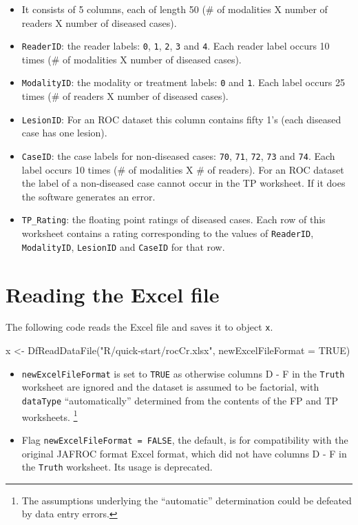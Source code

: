 \documentclass[
]{book}
\newenvironment{Shaded}{\begin{snugshade}}{\end{snugshade}}
\newcommand{\AttributeTok}[1]{\textcolor[rgb]{0.77,0.63,0.00}{#1}}
\newcommand{\ConstantTok}[1]{\textcolor[rgb]{0.00,0.00,0.00}{#1}}
\newcommand{\FunctionTok}[1]{\textcolor[rgb]{0.00,0.00,0.00}{#1}}
\newcommand{\NormalTok}[1]{#1}
\newcommand{\OtherTok}[1]{\textcolor[rgb]{0.56,0.35,0.01}{#1}}
\newcommand{\StringTok}[1]{\textcolor[rgb]{0.31,0.60,0.02}{#1}}
\providecommand{\tightlist}{%
  \setlength{\itemsep}{0pt}\setlength{\parskip}{0pt}}
\begin{document}
\begin{itemize}
\tightlist
\item
  It consists of 5 columns, each of length 50 (\# of modalities X number of readers X number of diseased cases).
\item
  \texttt{ReaderID}: the reader labels: \texttt{0}, \texttt{1}, \texttt{2}, \texttt{3} and \texttt{4}. Each reader label occurs 10 times (\# of modalities X number of diseased cases).
\item
  \texttt{ModalityID}: the modality or treatment labels: \texttt{0} and \texttt{1}. Each label occurs 25 times (\# of readers X number of diseased cases).
\item
  \texttt{LesionID}: For an ROC dataset this column contains fifty 1's (each diseased case has one lesion).
\item
  \texttt{CaseID}: the case labels for non-diseased cases: \texttt{70}, \texttt{71}, \texttt{72}, \texttt{73} and \texttt{74}. Each label occurs 10 times (\# of modalities X \# of readers). For an ROC dataset the label of a non-diseased case cannot occur in the TP worksheet. If it does the software generates an error.
\item
  \texttt{TP\_Rating}: the floating point ratings of diseased cases. Each row of this worksheet contains a rating corresponding to the values of \texttt{ReaderID}, \texttt{ModalityID}, \texttt{LesionID} and \texttt{CaseID} for that row.
\end{itemize}

\hypertarget{quick-start-read-datafile-structure-roc-dataset}{%
\section{Reading the Excel file}\label{quick-start-read-datafile-structure-roc-dataset}}

The following code reads the Excel file and saves it to object \texttt{x}.

\begin{Shaded}
\begin{Highlighting}[]
\NormalTok{x }\OtherTok{\textless{}{-}} \FunctionTok{DfReadDataFile}\NormalTok{(}\StringTok{"R/quick{-}start/rocCr.xlsx"}\NormalTok{, }\AttributeTok{newExcelFileFormat =} \ConstantTok{TRUE}\NormalTok{)}
\end{Highlighting}
\end{Shaded}

\begin{itemize}
\item
  \texttt{newExcelFileFormat} is set to \texttt{TRUE} as otherwise columns D - F in the \texttt{Truth} worksheet are ignored and the dataset is assumed to be factorial, with \texttt{dataType} ``automatically'' determined from the contents of the FP and TP worksheets. \footnote{The assumptions underlying the ``automatic'' determination could be defeated by data entry errors.}
\item
  Flag \texttt{newExcelFileFormat\ =\ FALSE}, the default, is for compatibility with the original JAFROC format Excel format, which did not have columns D - F in the \texttt{Truth} worksheet. Its usage is deprecated.
\end{itemize}
\end{document}
